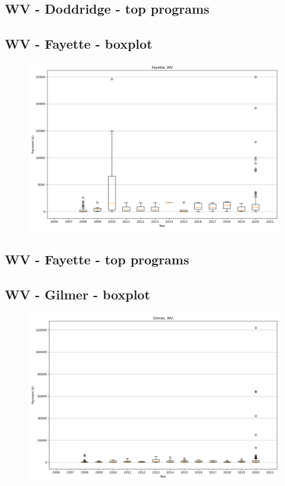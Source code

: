 \subsection*{WV - Doddridge - top programs}

\newpage
\subsection*{WV - Fayette - boxplot}
\begin{figure}[h]
\centering
\includegraphics[width=7in]{../output/boxplots/counties/Fayette-WV_boxplot.png}
\end{figure}


\subsection*{WV - Fayette - top programs}

\newpage
\subsection*{WV - Gilmer - boxplot}
\begin{figure}[h]
\centering
\includegraphics[width=7in]{../output/boxplots/counties/Gilmer-WV_boxplot.png}
\end{figure}


